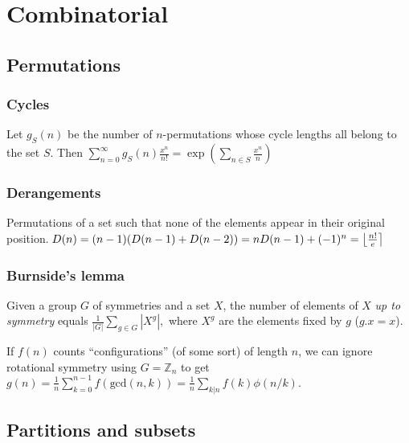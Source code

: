 \chapter{Combinatorial}

\section{Permutations}
	\subsection{Cycles}
		Let $g_S(n)$ be the number of $n$-permutations whose cycle lengths all belong to the set $S$. Then
    $\sum_{n=0} ^\infty g_S(n) \frac{x^n}{n!} = \exp\left(\sum_{n\in S} \frac{x^n} {n} \right)$

	\subsection{Derangements}
		Permutations of a set such that none of the elements appear in their original position.
		$ \mkern-2mu D(n) = (n-1)(D(n-1)+D(n-2)) = n D(n-1)+(-1)^n = \left\lfloor\frac{n!}{e}\right\rceil $

	\subsection{Burnside's lemma}
		Given a group $G$ of symmetries and a set $X$, the number of elements of $X$ \emph{up to symmetry} equals
		 $ {\frac {1}{|G|}}\sum _{{g\in G}}|X^{g}|, $
		 where $X^{g}$ are the elements fixed by $g$ ($g.x = x$).

		 If $f(n)$ counts ``configurations'' (of some sort) of length $n$, we can ignore rotational symmetry using $G = \mathbb Z_n$ to get
		 $ g(n) = \frac 1 n \sum_{k=0}^{n-1}{f(\text{gcd}(n, k))} = \frac 1 n \sum_{k|n}{f(k)\phi(n/k)}. $

\section{Partitions and subsets}

